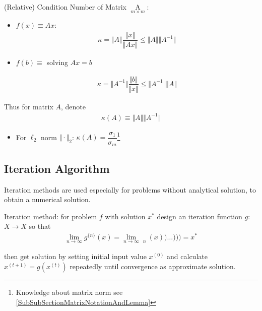 \begin{itemize}[topsep=2pt,itemsep=0pt]
    (Relative) Condition Number of Matrix $ \mathop{A}\limits_{m\times m}  $: 
    \begin{itemize}[topsep=2pt,itemsep=0pt]
        \item $ f(x)\equiv Ax $:
        \begin{align}
            \kappa =\Vert A\Vert \dfrac{ \Vert x\Vert }{\Vert Ax\Vert }\leq \Vert A\Vert \Vert A^{-1}\Vert  
        \end{align}
        \item $ f(b)\equiv  $ solving $ Ax=b $
        
        \begin{align}
            \kappa = \Vert A^{-1}\Vert \dfrac{\Vert b\Vert }{\Vert x\Vert }\leq \Vert A^{-1}\Vert \Vert A\Vert 
        \end{align}
    \end{itemize}
    
        Thus for matrix $ A $, denote 
        \begin{align}
            \kappa  (A)\equiv \Vert A\Vert\Vert A^{-1}\Vert 
        \end{align}
        
    \begin{itemize}[topsep=2pt,itemsep=0pt]
        \item For $ \ell_2 $ norm $ \Vert\cdot\Vert_2 $: $ \kappa (A)=\dfrac{\sigma  _1}{\sigma  _m} $\footnote{Knowledge about matrix norm see \autoref{SubSubSectionMatrixNotationAndLemma}}
    \end{itemize}
\end{itemize}


    
\subsection{Iteration Algorithm}
    Iteration methods are used especially for problems without analytical solution, to obtain a numerical solution.

    Iteration method: for problem $ f $ with solution $ x^* $ design an iteration function $ g $: $ X\to X $ so that 
    \begin{align}
        \lim_{n\to\infty}g^{\{n\}}(x)=\lim_{n\to\infty}\mathop{\underbrace{g(g(g(\ldots g(g}}\limits_{n}(x))\ldots ))) =x^*
    \end{align}
    
    then get solution by setting initial input value $ x^{(0)} $ and calculate $ x^{(t+1)}=g(x^{(t)}) $ repeatedly until convergence as approximate solution.
    

